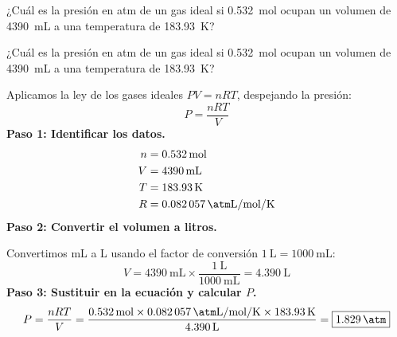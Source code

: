 \begin{exercise}
    ¿Cuál es la presión en atm de un gas ideal si \qty{0.532}{\mol} ocupan un volumen de \qty{4390}{\mL} a una temperatura de \qty{183.93}{\kelvin}?
    \begin{solu}
        ¿Cuál es la presión en atm de un gas ideal si \qty{0.532}{\mol} ocupan un volumen de \qty{4390}{\mL} a una temperatura de \qty{183.93}{\kelvin}?

        Aplicamos la ley de los gases ideales $PV = nRT$, despejando la presión:
        \begin{equation*}
            P = \frac{nRT}{V}
        \end{equation*}
        \textbf{Paso 1: Identificar los datos.}
        \begin{align*}
            n &= \qty{0.532}{\mol} \\
            V &= \qty{4390}{\mL} \\
            T &= \qty{183.93}{\kelvin} \\
            R &= \qty{0.082057}{\atm\liter\per\mol\per\kelvin}
        \end{align*}
        \textbf{Paso 2: Convertir el volumen a litros.}

        Convertimos mL a L usando el factor de conversión $\qty{1}{\liter} = \qty{1000}{\mL}$:
        \begin{equation*}
            V = \qty{4390}{\mL} \times \frac{\qty{1}{\liter}}{\qty{1000}{\mL}} = \qty{4.390}{\liter}
        \end{equation*}
        \textbf{Paso 3: Sustituir en la ecuación y calcular $P$.}
        \begin{equation*}
            P = \frac{nRT}{V} = \frac{\qty{0.532}{\mol} \times \qty{0.082057}{\atm\liter\per\mol\per\kelvin} \times \qty{183.93}{\kelvin}}{\qty{4.390}{\liter}} = \boxed{\qty{1.829}{\atm}}
        \end{equation*}
    \end{solu}
\end{exercise}
